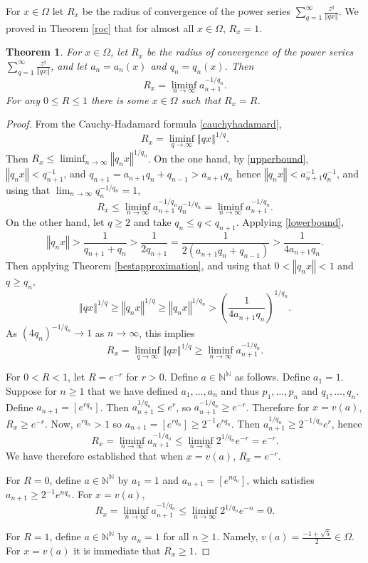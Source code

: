 \documentclass{article}
\newcommand{\norm}[1]{\left\Vert #1 \right\Vert}
\newtheorem{theorem}{Theorem}
\begin{document}
For $x \in \Omega$ let $R_x$ be the radius of convergence of the power series $\sum_{q=1}^\infty \frac{z^q}{\norm{qx}}$. 
We proved in Theorem \ref{roc} that for almost all $x \in \Omega$, $R_x=1$. 

\begin{theorem}
For  $x \in \Omega$, let $R_x$ be the radius of convergence of the power series $\sum_{q=1}^\infty \frac{z^q}{\norm{qx}}$, and let
$a_n=a_n(x)$ and $q_n=q_n(x)$. Then
\[
R_x = \liminf_{n \to \infty} a_{n+1}^{-1/q_n}.
\]
For any $0 \leq R \leq 1$ there is some $x \in \Omega$ such that $R_x=R$. 
\end{theorem}
\begin{proof}
From the Cauchy-Hadamard formula \eqref{cauchyhadamard},
\[
R_x =\liminf_{q \to \infty} \norm{qx}^{1/q}.
\]
Then $R_x \leq \liminf_{n \to \infty} \norm{q_n x}^{1/q_n}$. 
On the one hand, by \eqref{upperbound}, 
$\norm{q_n x}<q_{n+1}^{-1}$, 
and $q_{n+1} = a_{n+1} q_n + q_{n-1} > a_{n+1} q_n$ hence
$\norm{q_n x} < a_{n+1}^{-1} q_n^{-1}$, and using that
$\lim_{n \to \infty} q_n^{-1/q_n}=1$,
\[
R_x \leq \liminf_{n \to \infty} a_{n+1}^{-1/q_n} q_n^{-1/q_n}
=\liminf_{n \to \infty} a_{n+1}^{-1/q_n}.
\]
On the other hand, let $q \geq 2$ and take $q_n \leq q < q_{n+1}$. 
Applying \eqref{lowerbound},
\[
\norm{q_n x} > \frac{1}{q_{n+1}+q_n} 
> \frac{1}{2q_{n+1}} = 
\frac{1}{2(a_{n+1}q_n+q_{n-1})}
> \frac{1}{4a_{n+1} q_n}.
\]
Then applying Theorem \ref{bestapproximation}, and using that $0<\norm{q_n x}<1$ and
$q \geq q_n$,
\[
\norm{q x}^{1/q} \geq \norm{q_n x}^{1/q}
\geq \norm{q_n x}^{1/q_n} >
\left( \frac{1}{4a_{n+1} q_n} \right)^{1/q_n}.
\]
As $(4q_n)^{-1/q_n} \to 1$ as $n \to \infty$, this implies
\[
R_x = \liminf_{q \to \infty} \norm{q x}^{1/q} \geq \liminf_{n \to \infty} a_{n+1}^{-1/q_n}.
\]

For $0<R<1$, let $R=e^{-r}$ for $r>0$. Define $a \in \mathbb{N}^\mathbb{N}$ as follows.
Define $a_1=1$. Suppose for $n \geq 1$ that we have defined $a_1,\ldots,a_n$
and thus $p_1,\ldots,p_n$ and $q_1,\ldots,q_n$. 
Define
$a_{n+1} = [e^{r q_n}]$.
Then 
$a_{n+1}^{1/q_n} \leq e^r$, so $a_{n+1}^{-1/q_n} \geq e^{-r}$. Therefore for $x=v(a)$, $R_x \geq e^{-r}$. 
Now, $e^{rq_n}>1$ so $a_{n+1}=[e^{rq_n}] \geq 2^{-1} e^{rq_n}$. Then $a_{n+1}^{1/q_n} \geq 2^{-1/q_n}
e^r$, hence
\[
R_x = \liminf_{n \to \infty} a_{n+1}^{-1/q_n} \leq  \liminf_{n \to \infty} 2^{1/q_n} e^{-r} = e^{-r}.
\]
We have therefore established that when $x=v(a)$, $R_x = e^{-r}$. 

For $R=0$, define $a \in \mathbb{N}^\mathbb{N}$ by
$a_1=1$ and $a_{n+1} = [e^{nq_n}]$, which satisfies
$a_{n+1} \geq 2^{-1} e^{nq_n}$. For
$x=v(a)$,
\[
R_x = \liminf_{n \to \infty} a_{n+1}^{-1/q_n} \leq 
\liminf_{n \to \infty} 2^{1/q_n} e^{-n} = 0.
\]

For $R=1$, define $a \in \mathbb{N}^\mathbb{N}$ by $a_n=1$ for all $n \geq 1$.
Namely, $v(a) = \frac{-1+\sqrt{5}}{2} \in \Omega$. 
For $x=v(a)$ it is immediate that $R_x \geq 1$.
\end{proof}
\end{document}
